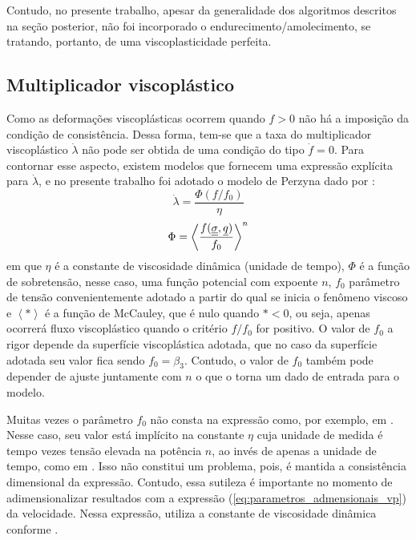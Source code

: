 Contudo, no presente trabalho, apesar da generalidade dos algoritmos descritos na seção posterior, não foi incorporado o endurecimento/amolecimento, se tratando, portanto, de uma viscoplasticidade perfeita.

\subsection{Multiplicador viscoplástico}
Como as deformações viscoplásticas ocorrem quando $f>0$ não há a imposição da condição de consistência. Dessa forma, tem-se que a taxa do multiplicador viscoplástico $\dot \lambda$ não pode ser obtida de uma condição do tipo $\dot f = 0$. Para contornar esse aspecto, existem modelos que fornecem uma expressão explícita para $\dot \lambda$, e no presente trabalho foi adotado o modelo de Perzyna dado por \cite[p. 823]{Zienkiewicz1974}:
\begin{equation}
	\label{eq:lambdavp}
	\dot \lambda = \dfrac{\Phi(f/f_0)}{\eta}
\end{equation}
\begin{equation}
	\label{eq:sobretensao}
	\Phi = \left\langle  \dfrac{f(\underline{\underline \sigma},\underline q)}{f_0} \right\rangle^n
\end{equation}
em que $\eta$ é a constante de viscosidade dinâmica (unidade de tempo), $\Phi$ é a função de sobretensão, nesse caso, uma função potencial com expoente $n$, $f_0$ parâmetro de tensão convenientemente adotado a partir do qual se inicia o fenômeno viscoso e $\left\langle * \right\rangle$ é a função de McCauley, que é nulo quando $*<0$, ou seja, apenas ocorrerá fluxo viscoplástico quando o critério $f/f_0$ for positivo. O valor de $f_0$ a rigor depende da superfície viscoplástica adotada, que no caso da superfície adotada seu valor fica sendo $f_0 = \beta_3$. Contudo, o valor de $f_0$ também pode depender de ajuste juntamente com $n$ o que o torna um dado de entrada para o modelo.

Muitas vezes o parâmetro $f_0$ não consta na expressão como, por exemplo, em . Nesse caso, seu valor está implícito na constante $\eta$ cuja unidade de medida é tempo vezes tensão elevada na potência $n$, ao invés de apenas a unidade de tempo, como em . Isso não constitui um problema, pois, é mantida a consistência dimensional da expressão. Contudo, essa sutileza é importante no momento de adimensionalizar resultados com a expressão (\ref{eq:parametros_admensionais_vp}) da velocidade. Nessa expressão,  utiliza a constante de viscosidade dinâmica conforme .

